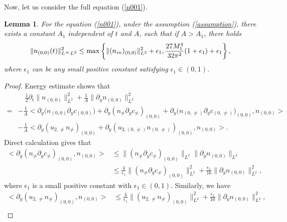 \documentclass[12pt, reqno]{amsart}
\newtheorem{lemma}{Lemma}[section]
\numberwithin{equation}{section}
\begin{document}
	
	Now, let us consider the full  equation (\ref{n001}).
	\begin{lemma}\label{lemma_n001}
		For the  equation (\ref{n001}), under the assumption (\ref{assumption}), there exists a constant $A_1$ independent of $t$ and $A$, such that if $A>A_1$, there holds
		\begin{align*}
			\|n_{(0,0)}(t)\|^2_{L^{\infty}L^2}\leq \max\left\{\|(n_{\rm in})_{(0,0)}\|^2_{L^2}+\epsilon_1,\frac{27M_1^4}{32\pi^2}(1+\epsilon_1)+\epsilon_1\right\},
		\end{align*}
		where $\epsilon_1$ can be any small positive constant satisfying $\epsilon_1\in(0,1)$.
	\end{lemma}
	\begin{proof}
		Energy estimate shows that 
		\begin{equation}\label{n00_1}
			\begin{aligned}
				&\quad\frac{1}{2}\partial_t\|n_{(0,0)}\|^2_{L^2}
				+\frac{1}{A}\|\partial_{y} n_{(0,0)}\|^2_{L^2}\\
				=&-\frac{1}{A}
				<\partial_{y}\big(n_{(0,0)}\partial_{y}c_{(0,0)}\big)
				+\partial_{y}(n_{\neq}\partial_y c_{\neq})_{(0,0)}
				+\partial_{y}\big(n_{(0,\neq)}\partial_{y}c_{(0,\neq)} \big)_{(0,0)} ,n_{(0,0)}>\\&-\frac{1}{A}<\partial_{y}(u_{2,\neq}n_{\neq})_{(0,0)}
				+\partial_{y}\left(u_{2,(0,\neq)}n_{(0,\neq)} \right)_{(0,0)},n_{(0,0)}>.
			\end{aligned}
		\end{equation}
		Direct calculation gives that 	
		\begin{equation}\label{n00_2}
			\begin{aligned}
				<\partial_{y}(n_{\neq}\partial_y c_{\neq})_{(0,0)},n_{(0,0)}>&
				\leq \|(n_{\neq}\partial_y c_{\neq})_{(0,0)}\|_{L^2}\|\partial_{y} n_{(0,0)}\|_{L^2}\\
				&\leq \frac{4}{\epsilon_1}\|(n_{\neq}\partial_y c_{\neq})_{(0,0)}\|^2_{L^2}+\frac{\epsilon_1}{16}\|\partial_{y} n_{(0,0)}\|^2_{L^2},	
			\end{aligned}
		\end{equation}
		where $\epsilon_1$ is a small positive constant with $\epsilon_1\in(0,1).$
		Similarly, we have 
		\begin{equation}\label{n00_3}
			\begin{aligned}
				<\partial_{y}(u_{2,\neq}n_{\neq})_{(0,0)},n_{(0,0)}>
				&\leq \frac{4}{\epsilon_1}\|(u_{2,\neq}n_{\neq})_{(0,0)}\|^2_{L^2}
				+\frac{\epsilon_1}{16}\|\partial_{y} n_{(0,0)}\|^2_{L^2},\\

\end{aligned}
\end{equation}
\end{proof}
\end{document}
